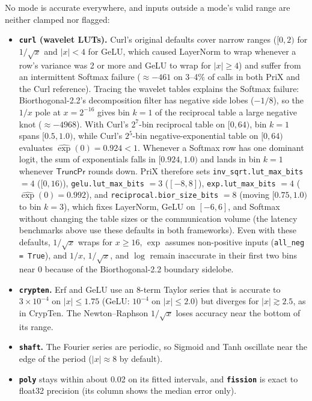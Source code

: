 \documentclass[11pt]{article}
\begin{document}
\begin{table}[t]
\centering
\caption{\textbf{Approximation error by mode} (default configuration of each mode, 2 parties, 10 runs, CPU). Each cell is the median absolute error / the worst-case absolute error over all runs. Bold marks a worst-case error above 0.1; $^\dagger$ marks functions for which at least one run had an error above 1.}
\label{tab:accuracy}
\vspace{2pt}
\footnotesize
\resizebox{\textwidth}{!}{%
%
}
\end{table}

No mode is accurate everywhere, and inputs outside a mode's valid range are neither clamped nor flagged:
\begin{itemize}
    \item \textbf{\texttt{curl} (wavelet LUTs).} Curl's original defaults cover narrow ranges ($[0, 2)$ for $1/\sqrt{x}$ and $|x| < 4$ for GeLU, which caused LayerNorm to wrap whenever a row's variance was 2 or more and GeLU to wrap for $|x| \ge 4$) and suffer from an intermittent Softmax failure ($\approx -461$ on 3--4\% of calls in both PriX and the Curl reference). Tracing the wavelet tables explains the Softmax failure: Biorthogonal-2.2's decomposition filter has negative side lobes ($-1/8$), so the $1/x$ pole at $x = 2^{-16}$ gives bin $k = 1$ of the reciprocal table a large negative knot ($\approx -4968$). With Curl's $2^7$-bin reciprocal table on $[0, 64)$, bin $k = 1$ spans $[0.5, 1.0)$, while Curl's $2^5$-bin negative-exponential table on $[0, 64)$ evaluates $\widehat{\exp}(0) = 0.924 < 1$. Whenever a Softmax row has one dominant logit, the sum of exponentials falls in $[0.924, 1.0)$ and lands in bin $k = 1$ whenever $\mathsf{TruncPr}$ rounds down. PriX therefore sets \texttt{inv\_sqrt.lut\_max\_bits} $= 4$ ($[0, 16)$), \texttt{gelu.lut\_max\_bits} $= 3$ ($[-8, 8]$), \texttt{exp.lut\_max\_bits} $= 4$ ($\widehat{\exp}(0) = 0.992$), and \texttt{reciprocal.bior\_size\_bits} $= 8$ (moving $[0.75, 1.0)$ to bin $k = 3$), which fixes LayerNorm, GeLU on $[-6, 6]$, and Softmax without changing the table sizes or the communication volume (the latency benchmarks above use these defaults in both frameworks). Even with these defaults, $1/\sqrt{x}$ wraps for $x \ge 16$, $\exp$ assumes non-positive inputs (\texttt{all\_neg = True}), and $1/x$, $1/\sqrt{x}$, and $\log$ remain inaccurate in their first two bins near 0 because of the Biorthogonal-2.2 boundary sidelobe.
    \item \textbf{\texttt{crypten}.} Erf and GeLU use an 8-term Taylor series that is accurate to $3 \times 10^{-4}$ on $|x| \le 1.75$ (GeLU: $10^{-4}$ on $|x| \le 2.0$) but diverges for $|x| \gtrsim 2.5$, as in CrypTen. The Newton--Raphson $1/\sqrt{x}$ loses accuracy near the bottom of its range.
    \item \textbf{\texttt{shaft}.} The Fourier series are periodic, so Sigmoid and Tanh oscillate near the edge of the period ($|x| \approx 8$ by default).
    \item \textbf{\texttt{poly}} stays within about 0.02 on its fitted intervals, and \textbf{\texttt{fission}} is exact to float32 precision (its column shows the median error only).
\end{itemize}
\end{document}
